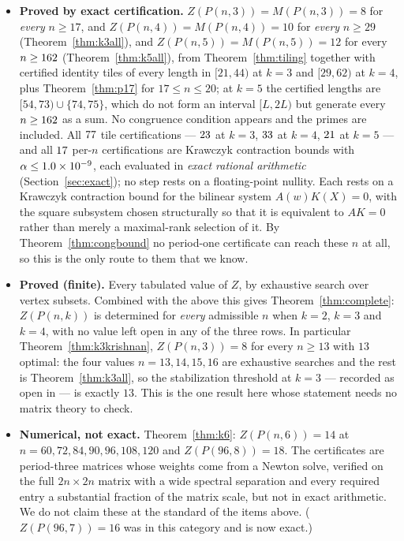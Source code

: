 \documentclass[11pt]{article}
\theoremstyle{definition}
\begin{document}
\begin{itemize}
\item \textbf{Proved by exact certification.} $Z(P(n,3))=M(P(n,3))=8$ for
\emph{every} $n\ge17$, and $Z(P(n,4))=M(P(n,4))=10$ for \emph{every} $n\ge29$
(Theorem~\ref{thm:k3all}), and $Z(P(n,5))=M(P(n,5))=12$ for every
$n\ge162$ (Theorem~\ref{thm:k5all}), from Theorem~\ref{thm:tiling}
together with certified identity tiles of every length in $[21,44)$ at $k=3$ and
$[29,62)$ at $k=4$, plus Theorem~\ref{thm:p17} for $17\le n\le20$; at $k=5$ the
certified lengths are $[54,73)\cup\{74,75\}$, which do not form an interval
$[L,2L)$ but generate every $n\ge162$ as a sum. No congruence condition
appears and the primes are included. All $77$ tile certifications --- 
$23$ at $k=3$, $33$ at $k=4$, $21$ at $k=5$ --- and all
$17$ per-$n$ certifications are Krawczyk contraction bounds with
$\alpha\le1.0\times10^{-9}$, each evaluated in \emph{exact rational arithmetic}
(Section~\ref{sec:exact}); no step rests on a floating-point nullity. Each rests on a Krawczyk contraction bound for the bilinear system
$A(w)K(X)=0$, with the square subsystem chosen structurally so that it is
equivalent to $AK=0$ rather than merely a maximal-rank selection of it. By
Theorem~\ref{thm:congbound} no period-one certificate can reach these $n$ at
all, so this is the only route to them that we know.

\item \textbf{Proved (finite).} Every tabulated value of $Z$, by exhaustive
search over vertex subsets. Combined with the above this gives
Theorem~\ref{thm:complete}: $Z(P(n,k))$ is determined for \emph{every}
admissible $n$ when $k=2$, $k=3$ and $k=4$, with no value left open in any of
the three rows. In particular Theorem~\ref{thm:k3krishnan},
$Z(P(n,3))=8$ for every $n\ge13$ with $13$ optimal: the four values
$n=13,14,15,16$ are exhaustive searches and the rest is
Theorem~\ref{thm:k3all}, so the stabilization threshold at $k=3$ --- recorded
as open in \cite{K} --- is exactly $13$. This is the one result here whose
statement needs no matrix theory to check.

\item \textbf{Numerical, not exact.} Theorem~\ref{thm:k6}: $Z(P(n,6))=14$ at
$n=60,72,84,90,96,108,120$ and $Z(P(96,8))=18$. The certificates are period-three
matrices whose weights come from a Newton solve, verified on the full
$2n\times2n$ matrix with a wide spectral separation and every required entry a
substantial fraction of the matrix scale, but not in exact arithmetic. We do not
claim these at the standard of the items above. ($Z(P(96,7))=16$ was in this
category and is now exact.)


\end{itemize}
\end{document}
